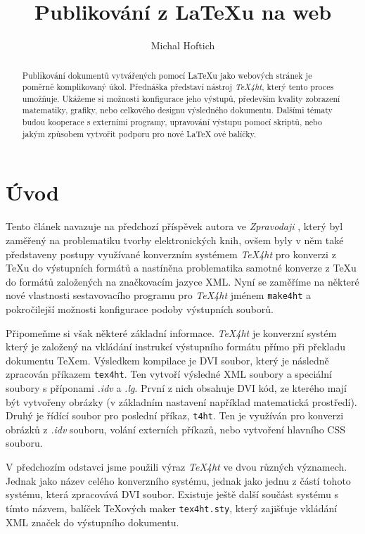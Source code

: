 \documentclass{csbulletin}
\newcommand\nazev[1]{\textit{#1}}
\newcommand\prikaz[1]{\texttt{#1}}
\begin{document}
\title{Publikování z \LaTeX u na web}
\author{Michal Hoftich}
\maketitle

\begin{abstract}
Publikování dokumentů vytvářených pomocí \LaTeX u jako webových stránek je
poměrně komplikovaný úkol. Přednáška představí nástroj \nazev{TeX4ht}, který
tento proces umožňuje. Ukážeme si možnosti konfigurace jeho výstupů, především
kvality zobrazení matematiky, grafiky, nebo celkového designu výsledného
dokumentu. Dalšími tématy budou kooperace s externími programy, upravování
výstupu pomocí skriptů, nebo jakým způsobem vytvořit podporu pro nové \LaTeX
ové balíčky. 
\end{abstract}

\section{Úvod}



Tento článek navazuje na předchozí příspěvek autora ve \nazev{Zpravodaji}
\parencite{hoftich:16}, který byl zaměřený na problematiku tvorby
elektronických knih, ovšem byly v něm také
představeny postupy využívané konverzním systémem \nazev{TeX4ht} pro konverzi z
\TeX u do výstupních formátů a nastíněna problematika samotné konverze z \TeX u
do formátů založených na značkovacím jazyce XML. 
Nyní se zaměříme na některé nové vlastnosti sestavovacího programu pro \nazev{TeX4ht} jménem
\prikaz{make4ht} a pokročilejší možnosti konfigurace podoby výstupních souborů.

Připomeňme si však některé základní informace. \nazev{TeX4ht} je konverzní
systém který je založený na vkládání instrukcí výstupního formátu přímo při
překladu dokumentu \TeX em. Výsledkem kompilace je DVI soubor, který je
následně zpracován příkazem \prikaz{tex4ht}. Ten vytvoří výsledné XML soubory a
speciální soubory s příponami \nazev{.idv} a \nazev{.lg}.
První z nich obsahuje DVI kód, ze kterého mají být vytvořeny obrázky (v
základním nastavení například matematická prostředí). Druhý je řídící soubor
pro poslední příkaz, \prikaz{t4ht}. Ten je využíván pro konverzi obrázků z
\nazev{.idv} souboru, volání externích příkazů, nebo vytvoření hlavního CSS
souboru.

V předchozím odstavci jsme použili výraz \nazev{TeX4ht} ve dvou různých
významech. Jednak jako název celého konverzního systému, jednak jako jednu z
částí tohoto systému, která zpracovává DVI soubor. Existuje ještě další součást
systému s tímto názvem, balíček \TeX ových maker \prikaz{tex4ht.sty}, který
zajišťuje vkládání XML značek do výstupního dokumentu.
\end{document}
